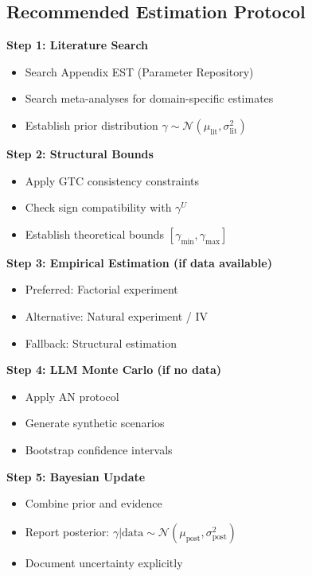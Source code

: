 \subsection{Recommended Estimation Protocol}
\label{subsec:estimation-protocol}

\begin{tcolorbox}[colback=green!5!white,colframe=green!75!black,title=\textbf{Standard Protocol for γ Estimation}]
\textbf{Step 1: Literature Search}
\begin{itemize}[noitemsep]
    \item Search Appendix EST (Parameter Repository)
    \item Search meta-analyses for domain-specific estimates
    \item Establish prior distribution $\gamma \sim \mathcal{N}(\mu_{\text{lit}}, \sigma_{\text{lit}}^2)$
\end{itemize}

\textbf{Step 2: Structural Bounds}
\begin{itemize}[noitemsep]
    \item Apply GTC consistency constraints
    \item Check sign compatibility with $\gamma^U$
    \item Establish theoretical bounds $[\gamma_{\min}, \gamma_{\max}]$
\end{itemize}

\textbf{Step 3: Empirical Estimation (if data available)}
\begin{itemize}[noitemsep]
    \item Preferred: Factorial experiment
    \item Alternative: Natural experiment / IV
    \item Fallback: Structural estimation
\end{itemize}

\textbf{Step 4: LLM Monte Carlo (if no data)}
\begin{itemize}[noitemsep]
    \item Apply AN protocol
    \item Generate synthetic scenarios
    \item Bootstrap confidence intervals
\end{itemize}

\textbf{Step 5: Bayesian Update}
\begin{itemize}[noitemsep]
    \item Combine prior and evidence
    \item Report posterior: $\gamma | \text{data} \sim \mathcal{N}(\mu_{\text{post}}, \sigma_{\text{post}}^2)$
    \item Document uncertainty explicitly
\end{itemize}
\end{tcolorbox}

